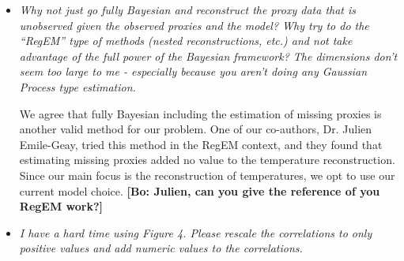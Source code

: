 \documentclass[11pt]{article}
\newcommand{\lb}[1]{\color{ForestGreen}\textbf{[Luis B.: #1]}\normalcolor}
\newcommand{\bl}[1]{\color{red}\textbf{[Bo: #1]}\normalcolor}
\newcommand{\jeg}[1]{\color{blue}\textbf{Julien: #1]}\normalcolor}
\begin{document}
\begin{itemize}

\item \textit{Why not just go fully Bayesian and reconstruct the proxy data that
    is unobserved given the observed proxies and the model? Why try to do the
    ``RegEM'' type of methods (nested reconstructions, etc.) and not take
    advantage of the full power of the Bayesian framework? The dimensions don't
    seem too large to me - especially because you aren't doing any Gaussian
    Process type estimation.
}

We agree that fully Bayesian including the estimation of missing proxies is another valid method for our problem. One of our co-authors, Dr. Julien Emile-Geay, tried this method in the RegEM context, and they found that estimating missing proxies added no value to the temperature reconstruction. Since our main focus is the reconstruction of temperatures, we opt to use our current model choice. \bl{Julien, can you give the reference of you RegEM work?}



\item \textit{I have a hard time using Figure 4. Please rescale the correlations
    to only positive values and add numeric values to the correlations.}


\end{itemize}
\end{document}
